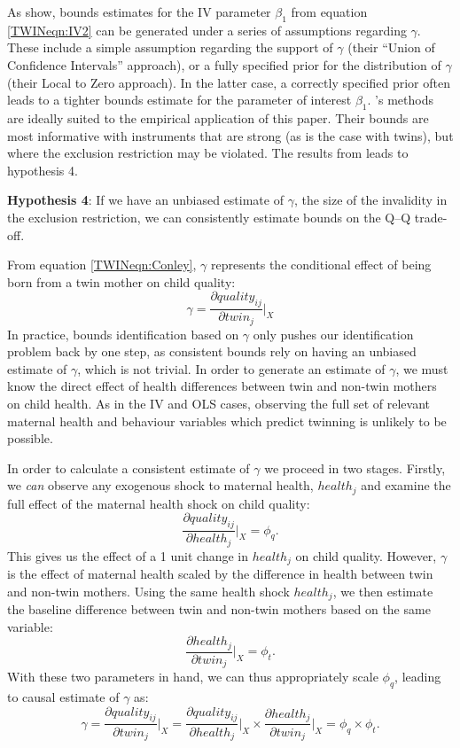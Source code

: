 \documentclass[subeqn]{article}
\begin{document}
\begin{spacing}{1.4}
As \citet{Conleyetal2012} show, bounds estimates for the IV parameter $\beta_1$
from equation \ref{TWINeqn:IV2} can be generated under a series of assumptions
regarding $\gamma$.  These include a simple assumption regarding the support of
$\gamma$ (their ``Union of Confidence Intervals'' approach), or a fully specified
prior for the distribution of $\gamma$ (their Local to Zero approach).  In the
latter case, a correctly specified prior often leads to a tighter bounds estimate
for the parameter of interest $\beta_1$.  \citeauthor{Conleyetal2012}'s methods
are ideally suited to the empirical application of this paper.  Their bounds
are most informative with instruments that are strong (as is the case with
twins), but where the exclusion restriction may be violated. The results from
\citet{Conleyetal2012} leads to hypothesis 4.

\noindent \textbf{Hypothesis 4}: If we have an unbiased estimate of $\gamma$, the size of the invalidity in the exclusion restriction, we can consistently estimate bounds on the Q--Q trade-off.

From equation \ref{TWINeqn:Conley}, $\gamma$ represents the conditional effect
of being born from a twin mother on child quality:
\[
\gamma=\frac{\partial quality_{ij}}{\partial twin_j}\bigg|_{X}
\]
In practice, bounds identification based on $\gamma$ only pushes our
identification problem back by one step, as consistent bounds rely on having
an unbiased estimate of $\gamma$, which is not trivial.  In order to generate
an estimate of $\gamma$, we must know the direct effect of health differences
between twin and non-twin mothers on child health.  As in the IV and OLS cases,
observing the full set of relevant maternal health and behaviour variables
which predict twinning is unlikely to be possible.

In order to calculate a consistent estimate of $\gamma$ we proceed in two
stages. Firstly, we \emph{can} observe any exogenous shock to maternal health,
$health_j$ and examine the full effect of the maternal health shock on child
quality:
\[
\frac{\partial quality_{ij}}{\partial health_j}\bigg|_{X}=\phi_q.
\]
This gives us the effect of a 1 unit change in $health_j$ on child quality.
However, $\gamma$ is the effect of maternal health scaled by the difference
in health between twin and non-twin mothers.  Using the same health shock
$health_j$, we then estimate the baseline difference between twin and non-twin
mothers based on the same variable:
\[
\frac{\partial health_j}{\partial twin_j}\bigg|_{X}=\phi_t.\]
With these two parameters in hand, we can thus appropriately scale $\phi_q$,
leading to causal estimate of $\gamma$ as:
\begin{equation}
  \gamma=\frac{\partial quality_{ij}}{\partial twin_j}\bigg|_{X} = \frac{\partial quality_{ij}}{\partial health_j}\bigg|_{X} \times \frac{\partial health_j}{\partial twin_j}\bigg|_{X} =\phi_q\times\phi_t.
\end{equation}


\end{spacing}
\end{document}
